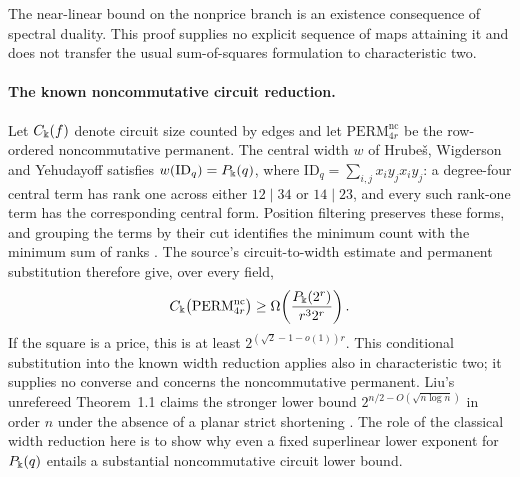 The near-linear bound on the nonprice branch is an existence
consequence of spectral duality. This proof supplies no explicit
sequence of maps attaining it and does not transfer the usual
sum-of-squares formulation to characteristic two.

\paragraph{The known noncommutative circuit reduction.}
Let \(C_\Bbbk(f)\) denote circuit size counted by edges and let
\(\mathrm{PERM}_{4r}^{\mathrm{nc}}\) be the row-ordered noncommutative
permanent. The central width \(w\) of Hrube\v{s}, Wigderson and
Yehudayoff satisfies
\(w(\mathrm{ID}_q)=P_\Bbbk(q)\), where
\(\mathrm{ID}_q=\sum_{i,j}x_i y_j x_i y_j\): a degree-four central
term has rank one across either \(12\mid34\) or \(14\mid23\), and
every such rank-one term has the corresponding central form.
Position filtering preserves these forms, and grouping the terms by
their cut identifies the minimum count with the minimum sum of ranks
\cite[Lemma~3.5, p.~883]{HrubesWigdersonYehudayoff2011}.
The source's circuit-to-width estimate and permanent substitution
\cite[Propositions~3.2 and~5.3, Lemma~5.5,
pp.~881--882, 888--889]{HrubesWigdersonYehudayoff2011}
therefore give, over every field,
\[
 C_\Bbbk\bigl(\mathrm{PERM}_{4r}^{\mathrm{nc}}\bigr)
 \geq \Omega\!\left(\frac{P_\Bbbk(2^r)}{r^3 2^r}\right).
\]
If the square is a price, this is at least
\(2^{(\sqrt2-1-o(1))r}\).
This conditional substitution into the known width reduction applies
also in characteristic two; it supplies no converse and concerns the
noncommutative permanent.
Liu's unrefereed Theorem~1.1 claims the stronger lower bound
\(2^{n/2-O(\sqrt{n\log n})}\) in order \(n\) under the absence of
a planar strict shortening \cite[p.~1]{Liu2026noncommutative}.
The role of the classical width reduction here is to show why even
a fixed superlinear lower exponent for \(P_\Bbbk(q)\) entails a
substantial noncommutative circuit lower bound.
